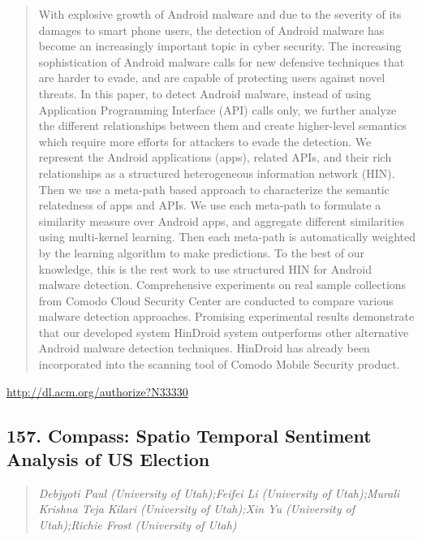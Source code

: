 \documentclass{article}
\begin{document}
\begin{quote}
With explosive growth of Android malware and due to the severity of its damages to smart phone users, the detection of Android malware has become an increasingly important topic in cyber security. The increasing sophistication of Android malware calls for new defensive techniques that are harder to evade, and are capable of protecting users against novel threats. In this paper, to detect Android malware, instead of using Application Programming Interface (API) calls only, we further analyze the different relationships between them and create higher-level semantics which require more efforts for attackers to evade the detection. We represent the Android applications (apps), related APIs, and their rich relationships as a structured heterogeneous information network (HIN). Then we use a meta-path based approach to characterize the semantic relatedness of apps and APIs. We use each meta-path to formulate a similarity measure over Android apps, and aggregate different similarities using multi-kernel learning. Then each meta-path is automatically weighted by the learning algorithm to make predictions. To the best of our knowledge, this is the rest work to use structured HIN for Android malware detection. Comprehensive experiments on real sample collections from Comodo Cloud Security Center are conducted to compare various malware detection approaches. Promising experimental results demonstrate that our developed system HinDroid system outperforms other alternative Android malware detection techniques. HinDroid has already been incorporated into the scanning tool of Comodo Mobile Security product.
\end{quote}

\href{http://dl.acm.org/authorize?N33330}{http://dl.acm.org/authorize?N33330}

\subsection{157. Compass: Spatio Temporal Sentiment Analysis of US Election}

\begin{quote}
\footnotesize{\textit{Debjyoti Paul (University of Utah);Feifei Li (University of Utah);Murali Krishna Teja Kilari (University of Utah);Xin Yu (University of Utah);Richie Frost (University of Utah)}}

\end{quote}
\end{document}
